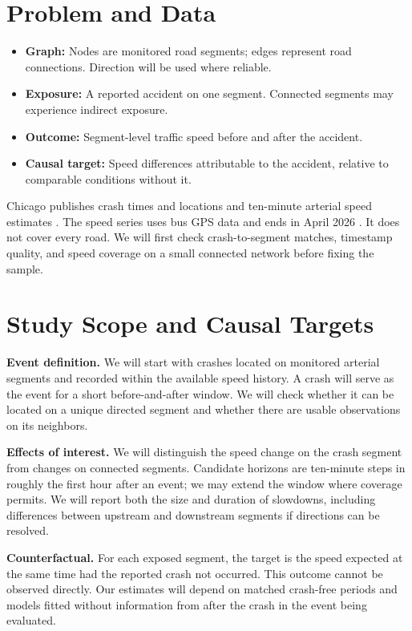 \documentclass[sigconf,nonacm]{acmart}
\begin{document}
\section{Problem and Data}
\begin{itemize}
    \item \textbf{Graph:} Nodes are monitored road segments; edges represent road connections. Direction will be used where reliable.
    \item \textbf{Exposure:} A reported accident on one segment. Connected segments may experience indirect exposure.
    \item \textbf{Outcome:} Segment-level traffic speed before and after the accident.
    \item \textbf{Causal target:} Speed differences attributable to the accident, relative to comparable conditions without it.
\end{itemize}

Chicago publishes crash times and locations and ten-minute arterial speed estimates \cite{chicagoCrashes,chicagoSpeeds}. The speed series uses bus GPS data and ends in April 2026 \cite{chicagoTrackerNotice}. It does not cover every road. We will first check crash-to-segment matches, timestamp quality, and speed coverage on a small connected network before fixing the sample.

\section{Study Scope and Causal Targets}
\textbf{Event definition.} We will start with crashes located on monitored arterial segments and recorded within the available speed history. A crash will serve as the event for a short before-and-after window. We will check whether it can be located on a unique directed segment and whether there are usable observations on its neighbors.

\textbf{Effects of interest.} We will distinguish the speed change on the crash segment from changes on connected segments. Candidate horizons are ten-minute steps in roughly the first hour after an event; we may extend the window where coverage permits. We will report both the size and duration of slowdowns, including differences between upstream and downstream segments if directions can be resolved.

\textbf{Counterfactual.} For each exposed segment, the target is the speed expected at the same time had the reported crash not occurred. This outcome cannot be observed directly. Our estimates will depend on matched crash-free periods and models fitted without information from after the crash in the event being evaluated.
\end{document}
